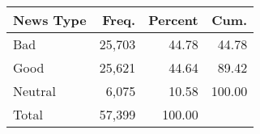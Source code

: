 \documentclass[border=0.2cm]{standalone}
\begin{document}
\begin{tabular}{lrrr}
    News Type & Freq.  & Percent & Cum.   \\
    \toprule
    Bad       & 25,703 & 44.78   & 44.78  \\
    Good      & 25,621 & 44.64   & 89.42  \\
    Neutral   & 6,075  & 10.58   & 100.00 \\
    \midrule
    Total     & 57,399 & 100.00  &        \\
\end{tabular}
\end{document}
